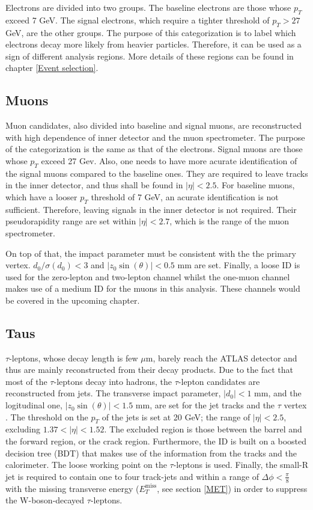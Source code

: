 \documentclass[class=NCU_thesis, crop=false]{standalone}
\begin{document}
		Electrons are divided into two groups. The baseline electrons are those whose $p_T$ exceed 7 GeV. The signal electrons, which require a tighter threshold of $p_T > 27$ GeV, are the other groups. The purpose of this categorization is to label which electrons decay more likely from heavier particles. Therefore, it can be used as a sign of different analysis regions. More details of these regions can be found in chapter \ref{Event selection}.
		
	\subsection{Muons}
		Muon candidates, also divided into baseline and signal muons, are reconstructed with high dependence of inner detector and the muon spectrometer. The purpose of the categorization is the same as that of the electrons. Signal muons are those whose $p_T$ exceed 27 Gev. Also, one needs to have more acurate identification of the signal muons compared to the baseline ones. They are required to leave tracks in the inner detector, and thus shall be found in $\lvert \eta \rvert < 2.5$. For baseline muons, which have a looser $p_T$ threshold of 7 GeV, an acurate identification is not sufficient. Therefore, leaving signals in the inner detector is not required. Their pseudorapidity range are set within $\lvert \eta \rvert < 2.7$, which is the range of the muon spectrometer.
		
		On top of that, the impact parameter must be consistent with the the primary vertex. $d_0 / \sigma(d_0) < 3$ and $\lvert z_0 \sin(\theta) \rvert < 0.5$ mm are set. Finally, a loose ID is used for the zero-lepton and two-lepton channel whilst the one-muon channel makes use of a medium ID for the muons in this analysis. These channels would be covered in the upcoming chapter.
		
	\subsection{Taus}
		$\tau$-leptons, whose decay length is few $\mu$m, barely reach the ATLAS detector and thus are mainly reconstructed from their decay products. Due to the fact that most of the $\tau$-leptons decay into hadrons, the $\tau$-lepton candidates are reconstructed from jets. The transverse impact parameter, $\lvert d_0 \rvert < 1$ mm, and the logitudinal one, $\lvert z_0 \sin(\theta) \rvert < 1.5$ mm, are set for the jet tracks and the $\tau$ vertex \cite{1412.7086}. The threshold on the $p_T$ of the jets is set at 20 GeV; the range of $\lvert \eta \rvert < 2.5$, excluding $1.37 < \lvert \eta \rvert < 1.52$. The excluded region is those between the barrel and the forward region, or the crack region. Furthermore, the ID is built on a boosted decision tree (BDT) that makes use of the information from the tracks and the calorimeter. The loose working point on the $\tau$-leptons is used. Finally, the small-R jet is required to contain one to four track-jets and within a range of $\Delta \phi < \frac{\pi}{8}$ with the missing transverse energy ($E_T^{\mathrm{miss}}$, see section \ref{MET}) in order to suppress the W-boson-decayed $\tau$-leptons.
	
\end{document}
